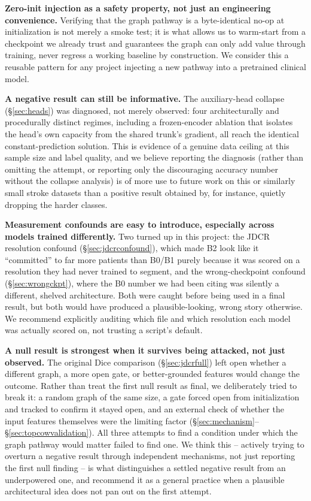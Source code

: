 \documentclass[conference]{IEEEtran}
\begin{document}
\textbf{Zero-init injection as a safety property, not just an engineering convenience.} Verifying that the graph pathway is a byte-identical no-op at initialization is not merely a smoke test; it is what allows us to warm-start from a checkpoint we already trust and guarantees the graph can only add value through training, never regress a working baseline by construction. We consider this a reusable pattern for any project injecting a new pathway into a pretrained clinical model.

\textbf{A negative result can still be informative.} The auxiliary-head collapse (\S\ref{sec:heads}) was diagnosed, not merely observed: four architecturally and procedurally distinct regimes, including a frozen-encoder ablation that isolates the head's own capacity from the shared trunk's gradient, all reach the identical constant-prediction solution. This is evidence of a genuine data ceiling at this sample size and label quality, and we believe reporting the diagnosis (rather than omitting the attempt, or reporting only the discouraging accuracy number without the collapse analysis) is of more use to future work on this or similarly small stroke datasets than a positive result obtained by, for instance, quietly dropping the harder classes.

\textbf{Measurement confounds are easy to introduce, especially across models trained differently.} Two turned up in this project: the JDCR resolution confound (\S\ref{sec:jdcrconfound}), which made B2 look like it ``committed'' to far more patients than B0/B1 purely because it was scored on a resolution they had never trained to segment, and the wrong-checkpoint confound (\S\ref{sec:wrongckpt}), where the B0 number we had been citing was silently a different, shelved architecture. Both were caught before being used in a final result, but both would have produced a plausible-looking, wrong story otherwise. We recommend explicitly auditing which file and which resolution each model was actually scored on, not trusting a script's default.

\textbf{A null result is strongest when it survives being attacked, not just observed.} The original Dice comparison (\S\ref{sec:jdcrfull}) left open whether a different graph, a more open gate, or better-grounded features would change the outcome. Rather than treat the first null result as final, we deliberately tried to break it: a random graph of the same size, a gate forced open from initialization and tracked to confirm it stayed open, and an external check of whether the input features themselves were the limiting factor (\S\ref{sec:mechanism}--\S\ref{sec:topcowvalidation}). All three attempts to find a condition under which the graph pathway would matter failed to find one. We think this -- actively trying to overturn a negative result through independent mechanisms, not just reporting the first null finding -- is what distinguishes a settled negative result from an underpowered one, and recommend it as a general practice when a plausible architectural idea does not pan out on the first attempt.
\end{document}
